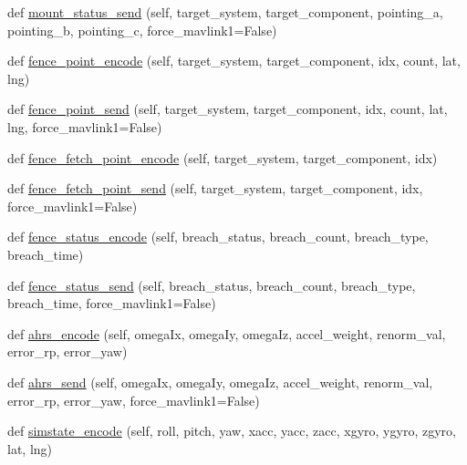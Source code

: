 \begin{DoxyCompactItemize}
def \hyperlink{classpymavlink_1_1dialects_1_1v10_1_1MAVLink_a3e02d8c1253680a64f754be170ea8753}{mount\+\_\+status\+\_\+send} (self, target\+\_\+system, target\+\_\+component, pointing\+\_\+a, pointing\+\_\+b, pointing\+\_\+c, force\+\_\+mavlink1=False)
\item 
def \hyperlink{classpymavlink_1_1dialects_1_1v10_1_1MAVLink_acadee5ae8c23275276e31be7559ee082}{fence\+\_\+point\+\_\+encode} (self, target\+\_\+system, target\+\_\+component, idx, count, lat, lng)
\item 
def \hyperlink{classpymavlink_1_1dialects_1_1v10_1_1MAVLink_a474b211df1601df1f84c89ba820b1ac9}{fence\+\_\+point\+\_\+send} (self, target\+\_\+system, target\+\_\+component, idx, count, lat, lng, force\+\_\+mavlink1=False)
\item 
def \hyperlink{classpymavlink_1_1dialects_1_1v10_1_1MAVLink_a1d4ca04da6d59c2e2ca27d58cbb98db5}{fence\+\_\+fetch\+\_\+point\+\_\+encode} (self, target\+\_\+system, target\+\_\+component, idx)
\item 
def \hyperlink{classpymavlink_1_1dialects_1_1v10_1_1MAVLink_ab027f982218ab0c6ad2d19b6c62835d1}{fence\+\_\+fetch\+\_\+point\+\_\+send} (self, target\+\_\+system, target\+\_\+component, idx, force\+\_\+mavlink1=False)
\item 
def \hyperlink{classpymavlink_1_1dialects_1_1v10_1_1MAVLink_a71abbc2d37a0cdc0bfe075a1b84d9b14}{fence\+\_\+status\+\_\+encode} (self, breach\+\_\+status, breach\+\_\+count, breach\+\_\+type, breach\+\_\+time)
\item 
def \hyperlink{classpymavlink_1_1dialects_1_1v10_1_1MAVLink_a8beb62e953ac18f013eeb8d788ebf6fd}{fence\+\_\+status\+\_\+send} (self, breach\+\_\+status, breach\+\_\+count, breach\+\_\+type, breach\+\_\+time, force\+\_\+mavlink1=False)
\item 
def \hyperlink{classpymavlink_1_1dialects_1_1v10_1_1MAVLink_a6b4fd5e23415e3bf5eb53122dd4dfb95}{ahrs\+\_\+encode} (self, omega\+Ix, omega\+Iy, omega\+Iz, accel\+\_\+weight, renorm\+\_\+val, error\+\_\+rp, error\+\_\+yaw)
\item 
def \hyperlink{classpymavlink_1_1dialects_1_1v10_1_1MAVLink_afdaf928d289a07098f7671d79c9b09c6}{ahrs\+\_\+send} (self, omega\+Ix, omega\+Iy, omega\+Iz, accel\+\_\+weight, renorm\+\_\+val, error\+\_\+rp, error\+\_\+yaw, force\+\_\+mavlink1=False)
\item 
def \hyperlink{classpymavlink_1_1dialects_1_1v10_1_1MAVLink_a31313ecf6b3e740b9f8c7e5927558fe9}{simstate\+\_\+encode} (self, roll, pitch, yaw, xacc, yacc, zacc, xgyro, ygyro, zgyro, lat, lng)
\item 

\end{DoxyCompactItemize}
